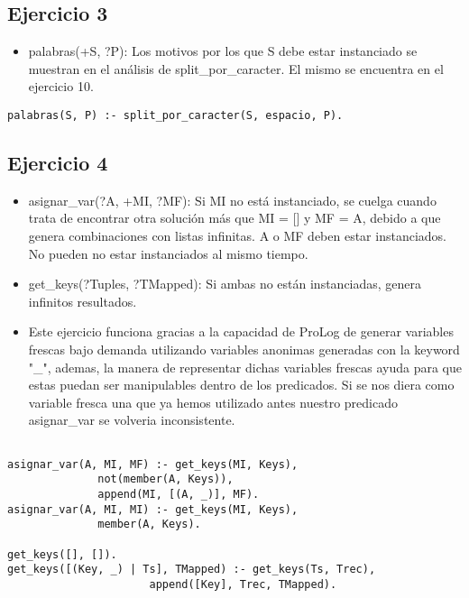 \documentclass[spanish, 10pt,a4paper]{article}
\numberwithin{equation}{section} %
\begin{document}
\subsection{Ejercicio 3}

\begin{itemize}
\item palabras(+S, ?P): Los motivos por los que S debe estar instanciado se muestran en el análisis de split\_por\_caracter. El mismo se encuentra en el ejercicio 10.
\end{itemize}
\begin{lstlisting}
palabras(S, P) :- split_por_caracter(S, espacio, P).  
\end{lstlisting}

\subsection{Ejercicio 4}

\begin{itemize}
\item asignar\_var(?A, +MI, ?MF): Si MI no está instanciado, se cuelga cuando trata de encontrar otra solución más que MI = [] y MF = A, debido a que genera
combinaciones con listas infinitas. A o MF deben estar instanciados. No pueden no estar instanciados al mismo tiempo.

\item get\_keys(?Tuples, ?TMapped): Si ambas no están instanciadas, genera infinitos resultados.

\item Este ejercicio funciona gracias a la capacidad de ProLog de generar variables frescas bajo demanda utilizando 
variables anonimas generadas con la keyword "\_", ademas, la manera de representar dichas variables frescas ayuda para que estas puedan ser manipulables dentro de los predicados.
Si se nos diera como variable fresca una que ya hemos utilizado antes nuestro predicado asignar\_var se volveria inconsistente.
\end{itemize}
\begin{lstlisting}

asignar_var(A, MI, MF) :- get_keys(MI, Keys), 
			  not(member(A, Keys)), 
			  append(MI, [(A, _)], MF).
asignar_var(A, MI, MI) :- get_keys(MI, Keys), 
			  member(A, Keys).

get_keys([], []).
get_keys([(Key, _) | Ts], TMapped) :- get_keys(Ts, Trec), 
				      append([Key], Trec, TMapped).
\end{lstlisting}
\end{document}
